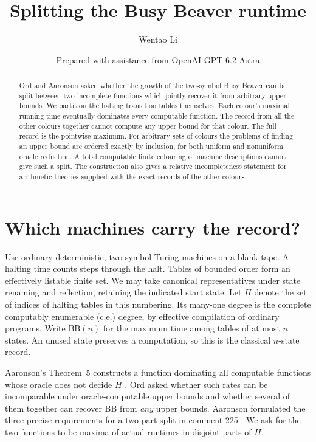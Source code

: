 \documentclass[11pt]{article}
\title{Splitting the Busy Beaver runtime}
\author{Wentao Li}
\date{\small Prepared with assistance from OpenAI GPT-6.2 Astra}
\newcommand{\BB}{\mathrm{BB}}
\begin{document}
\maketitle
\begin{abstract}
Ord and Aaronson asked whether the growth of the two-symbol Busy Beaver can be split between two incomplete functions which jointly recover it from arbitrary upper bounds. We partition the halting transition tables themselves. Each colour's maximal running time eventually dominates every computable function. The record from all the other colours together cannot compute any upper bound for that colour. The full record is the pointwise maximum. For arbitrary sets of colours the problems of finding an upper bound are ordered exactly by inclusion, for both uniform and nonuniform oracle reduction. A total computable finite colouring of machine descriptions cannot give such a split. The construction also gives a relative incompleteness statement for arithmetic theories supplied with the exact records of the other colours.
\end{abstract}

\section{Which machines carry the record?}
Use ordinary deterministic, two-symbol Turing machines on a blank tape. A halting time counts steps through the halt. Tables of bounded order form an effectively listable finite set. We may take canonical representatives under state renaming and reflection, retaining the indicated start state. Let $H$ denote the set of indices of halting tables in this numbering. Its many-one degree is the complete computably enumerable (c.e.) degree, by effective compilation of ordinary programs. Write $\BB(n)$ for the maximum time among tables of at most $n$ states. An unused state preserves a computation, so this is the classical $n$-state record.

Aaronson's Theorem~5 constructs a function dominating all computable functions whose oracle does not decide $H$ \cite{frontier}. Ord asked whether such rates can be incomparable under oracle-computable upper bounds and whether several of them together can recover $\BB$ from \emph{any} upper bounds. Aaronson formulated the three precise requirements for a two-part split in comment 225 \cite{discussion}. We ask for the two functions to be maxima of actual runtimes in disjoint parts of $H$.
\end{document}
